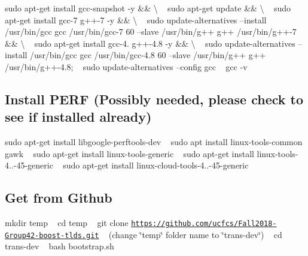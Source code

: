  sudo apt-\/get install gcc-\/snapshot -\/y \&\& \textbackslash{} ~\newline
 sudo apt-\/get update \&\& \textbackslash{} ~\newline
 sudo apt-\/get install gcc-\/7 g++-\/7 -\/y \&\& \textbackslash{} ~\newline
 sudo update-\/alternatives --install /usr/bin/gcc gcc /usr/bin/gcc-\/7 60 --slave /usr/bin/g++ g++ /usr/bin/g++-\/7 \&\& \textbackslash{} ~\newline
 sudo apt-\/get install gcc-\/4. g++-\/4.8 -\/y \&\& \textbackslash{} ~\newline
 sudo update-\/alternatives --install /usr/bin/gcc gcc /usr/bin/gcc-\/4.8 60 --slave /usr/bin/g++ g++ /usr/bin/g++-\/4.8; ~\newline
 sudo update-\/alternatives --config gcc ~\newline
 gcc -\/v ~\newline
\hypertarget{index_step3}{}\subsection{Install P\+E\+R\+F (\+Possibly needed, please check to see if installed already)}\label{index_step3}
sudo apt-\/get install libgoogle-\/perftools-\/dev ~\newline
 sudo apt install linux-\/tools-\/common gawk ~\newline
 sudo apt-\/get install linux-\/tools-\/generic ~\newline
 sudo apt-\/get install linux-\/tools-\/4..-\/45-\/generic ~\newline
 sudo apt-\/get install linux-\/cloud-\/tools-\/4..-\/45-\/generic ~\newline
\hypertarget{index_step4}{}\subsection{Get from Github}\label{index_step4}
mkdir temp ~\newline
 cd temp ~\newline
 git clone \href{https://github.com/ucf-cs/boost-tlds.git}{\tt https\+://github.\+com/ucfcs/\+Fall2018-\/\+Group42-\/boost-\/tlds.\+git} ~\newline
 (change \char`\"{}temp\char`\"{} folder name to \char`\"{}trans-\/dev\char`\"{}) ~\newline
 cd trans-\/dev ~\newline
 bash bootstrap.\+sh ~\newline
